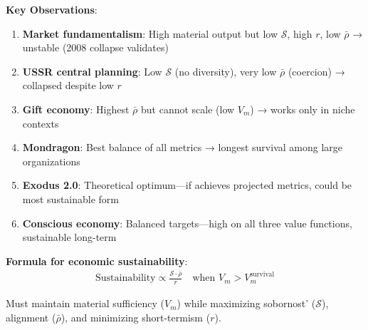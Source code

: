 \documentclass[11pt,a4paper]{article}
\theoremstyle{definition}
\theoremstyle{remark}
\begin{document}
\begin{small}
\begin{enumerate}
\textbf{Key Observations}:
\begin{enumerate}
    \item \textbf{Market fundamentalism}: High material output but low \(\mathcal{S}\), high \(r\), low \(\bar{\rho}\) → unstable (2008 collapse validates)
    \item \textbf{USSR central planning}: Low \(\mathcal{S}\) (no diversity), very low \(\bar{\rho}\) (coercion) → collapsed despite low \(r\)
    \item \textbf{Gift economy}: Highest \(\bar{\rho}\) but cannot scale (low \(V_m\)) → works only in niche contexts
    \item \textbf{Mondragon}: Best balance of all metrics → longest survival among large organizations
    \item \textbf{Exodus 2.0}: Theoretical optimum—if achieves projected metrics, could be most sustainable form
    \item \textbf{Conscious economy}: Balanced targets—high on all three value functions, sustainable long-term
\end{enumerate}

\textbf{Formula for economic sustainability}:
\begin{align}
\text{Sustainability} \propto \frac{\mathcal{S} \cdot \bar{\rho}}{r} \quad \text{when } V_m > V_m^{\text{survival}}
\end{align}

Must maintain material sufficiency (\(V_m\)) while maximizing sobornost' (\(\mathcal{S}\)), alignment (\(\bar{\rho}\)), and minimizing short-termism (\(r\)).

\vspace{2em}

\begin{figure}[H]
\centering
{}
\end{figure}
\end{enumerate}
\end{small}
\end{document}
